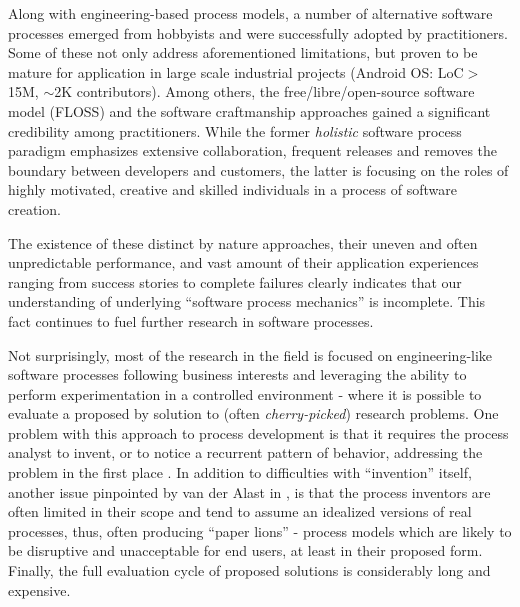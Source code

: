 Along with engineering-based process models, a number of alternative software processes emerged 
from hobbyists and were successfully adopted by practitioners. Some of these not only 
address aforementioned limitations, but proven to be mature for application in large scale industrial 
projects (Android OS: LoC$>$15M, $\sim$2K contributors). 
Among others, the free/libre/open-source software model (FLOSS) and the software craftmanship 
approaches gained a significant credibility among practitioners.
While the former \textit{holistic} software process paradigm emphasizes extensive collaboration, 
frequent releases and removes the boundary between developers and customers, the latter is focusing 
on the roles of highly motivated, creative and skilled individuals in a process of software creation. 

The existence of these distinct by nature approaches, their uneven and often unpredictable performance, 
and vast amount of their application experiences ranging from success stories to complete failures clearly 
indicates that our understanding of underlying ``software process mechanics'' is incomplete. This
fact continues to fuel further research in software processes.

Not surprisingly, most of the research in the field is focused on engineering-like software processes following business 
interests and leveraging the ability to perform experimentation in a controlled environment - where it is possible to 
evaluate a proposed by solution to (often \textit{cherry-picked}) research problems. 
One problem with this approach to process development is that it requires the process analyst to invent, or to notice 
a recurrent pattern of behavior, addressing the problem in the first place \cite{citeulike:5043104}. 
In addition to difficulties with ``invention'' itself, another issue pinpointed by van der Alast in \cite{citeulike:9758924}, 
is that the process inventors are often limited in their scope and tend to assume an idealized versions of real processes, 
thus, often producing ``paper lions'' - process models which are likely to be disruptive and unacceptable for end users, 
at least in their proposed form. Finally, the full evaluation cycle of proposed solutions is considerably long and expensive.

